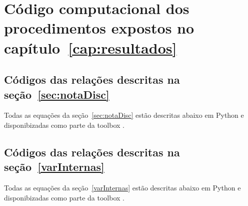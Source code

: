 \chapter{Código computacional dos procedimentos expostos no capítulo~\ref{cap:resultados}}
\label{cap:codigoProc}

\section{Códigos das relações descritas na seção~\ref{sec:notaDisc}}\label{sec:cod1}
Todas as equações da seção~\ref{sec:notaDisc} estão descritas abaixo em Python e disponibizadas como parte da toolbox \massa.






\section{Códigos das relações descritas na seção~\ref{varInternas}}\label{sec:cod2}
Todas as equações da seção~\ref{varInternas} estão descritas abaixo em Python e disponibizadas como parte da toolbox \massa.


